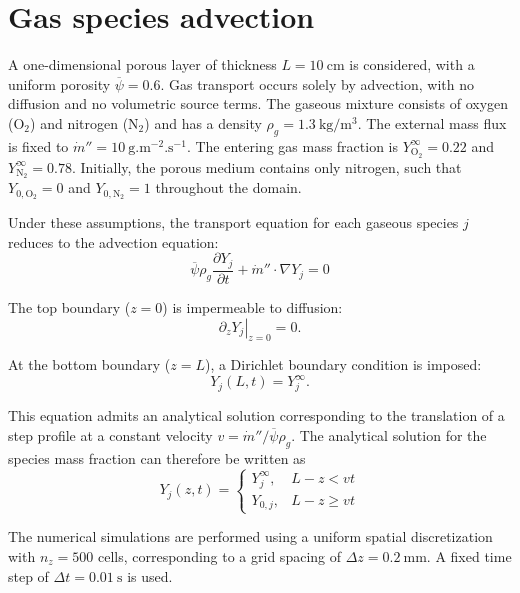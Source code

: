 \documentclass[12pt]{article}
\begin{document}
\fi

\section{Gas species advection}

A one-dimensional porous layer of thickness $ L = 10~\mathrm{cm} $ is considered, with a uniform porosity $ \overline{\psi} = 0.6 $. Gas transport occurs solely by advection, with no diffusion and no volumetric source terms. The gaseous mixture consists of oxygen ($ \mathrm{O_2} $) and nitrogen ($ \mathrm{N_2} $) and has a density $ \rho_g = 1.3~\mathrm{kg/m^3} $. The external mass flux is fixed to $ \dot{m}'' = 10~\mathrm{g.m^{-2}.s^{-1}} $. The entering gas mass fraction is $ Y_{\mathrm{O_2}}^{\infty} = 0.22 $ and $ Y_{\mathrm{N_2}}^{\infty} = 0.78 $. Initially, the porous medium contains only nitrogen, such that $ Y_{0,\mathrm{O_2}} = 0 $ and $ Y_{0,\mathrm{N_2}} = 1 $ throughout the domain. 

Under these assumptions, the transport equation for each gaseous species $ j $ reduces to the advection equation:
\begin{equation}
\overline{\psi} \rho_g \frac{\partial Y_j}{\partial t} + \dot{m}'' \cdot \nabla Y_j = 0
\end{equation}

The top boundary ($ z = 0 $) is impermeable to diffusion:
\begin{equation}
\left. \partial_z Y_j \right|_{z=0} = 0.
\end{equation}

At the bottom boundary ($ z = L $), a Dirichlet boundary condition is imposed:
\begin{equation}
Y_j(L,t) = Y_j^{\infty}.
\end{equation}

This equation admits an analytical solution corresponding to the translation of a step profile at a constant velocity $v = {\dot{m}''}/{\overline{\psi}\rho_g}$. The analytical solution for the species mass fraction can therefore be written as
\begin{equation}
Y_j(z,t) =
\begin{cases}
Y_j^{\infty}, & L-z < v t \\
Y_{0,j}, & L-z \ge v t
\end{cases}
\end{equation}

The numerical simulations are performed using a uniform spatial discretization with $ n_z = 500 $ cells, corresponding to a grid spacing of $ \Delta z = 0.2~\mathrm{mm} $. A fixed time step of $ \Delta t = 0.01~\mathrm{s} $ is used.
\end{document}
